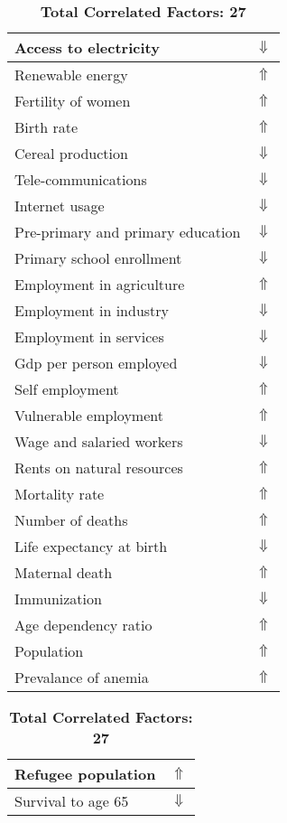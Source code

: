 \documentclass[12pt,notitlepage,oneside]{report}
\begin{document}
\begin{table}[!htb]
\caption{\textbf{Shows Symptom: Swollen lymph nodes $\Uparrow$}}
\centering
\label{Correlated Socio-economic Factors0}
\begin{tabular}{|l|l|}
\hline
Access to electricity & $\Downarrow$\\ \hline
Renewable energy & $\Uparrow$\\ \hline
Fertility of women & $\Uparrow$\\ \hline
Birth rate & $\Uparrow$\\ \hline
Cereal production & $\Downarrow$\\ \hline
Tele-communications & $\Downarrow$\\ \hline
Internet usage & $\Downarrow$\\ \hline
Pre-primary and primary education & $\Downarrow$\\ \hline
Primary school enrollment & $\Downarrow$\\ \hline
Employment in agriculture & $\Uparrow$\\ \hline
Employment in industry & $\Downarrow$\\ \hline
Employment in services & $\Downarrow$\\ \hline
Gdp per person employed & $\Downarrow$\\ \hline
Self employment & $\Uparrow$\\ \hline
Vulnerable employment & $\Uparrow$\\ \hline
Wage and salaried workers & $\Downarrow$\\ \hline
Rents on natural resources & $\Uparrow$\\ \hline
Mortality rate & $\Uparrow$\\ \hline
Number of deaths & $\Uparrow$\\ \hline
Life expectancy at birth & $\Downarrow$\\ \hline
Maternal death & $\Uparrow$\\ \hline
Immunization & $\Downarrow$\\ \hline
Age dependency ratio & $\Uparrow$\\ \hline
Population & $\Uparrow$\\ \hline
Prevalance of anemia & $\Uparrow$\\ \hline
\end{tabular}
\begin{tabular}{|l|l|}
\hline
Refugee population & $\Uparrow$\\ \hline
Survival to age 65 & $\Downarrow$\\ \hline
\end{tabular}
\caption*{\textbf{Total Correlated Factors: 27}}
\end{table}
\end{document}
